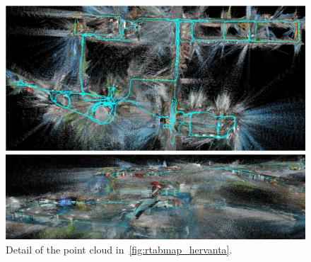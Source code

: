 \documentclass[11pt, letterpaper, twoside]{article}
\begin{document}
\begin{figure}[tb]
    \centering

    \includegraphics[width=\textwidth]{rtabmap_hervanta.png}
    \caption{%
        Point cloud of four buildings in Hervanta Campus, generated with \gls{rtabmap}.
    }\label{fig:rtabmap_hervanta}

    \vspace{0.5em}

    \includegraphics[width=\textwidth]{rtabmap_hervanta_detail.png}
    \caption{Detail of the point cloud in~\cref{fig:rtabmap_hervanta}.}\label{fig:rtabmap_hervanta_detail}

    \vspace{0.5em}


\end{figure}
\end{document}
